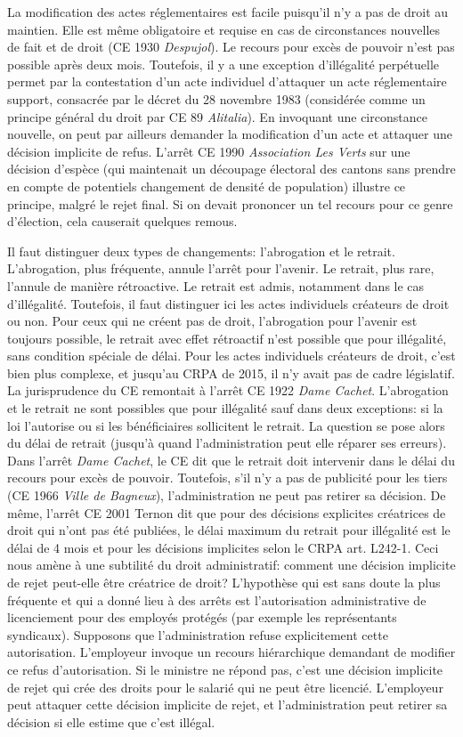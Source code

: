 \documentclass[math]{cours}
\begin{document}
La modification des actes réglementaires est facile puisqu'il n'y a pas de droit au maintien.
Elle est même obligatoire et requise en cas de circonstances nouvelles de fait et de droit (CE 1930 \emph{Despujol}).
Le recours pour excès de pouvoir n'est pas possible après deux mois.
Toutefois, il y a une exception d'illégalité perpétuelle permet par la contestation d'un acte individuel d'attaquer un acte réglementaire support, consacrée par le décret du 28 novembre 1983 (considérée comme un principe général du droit par CE 89 \emph{Alitalia}).
En invoquant une circonstance nouvelle, on peut par ailleurs demander la modification d'un acte et attaquer une décision implicite de refus.
L'arrêt CE 1990 \emph{Association Les Verts} sur une décision d'espèce (qui maintenait un découpage électoral des cantons sans prendre en compte de potentiels changement de densité de population) illustre ce principe, malgré le rejet final.
Si on devait prononcer un tel recours pour ce genre d'élection, cela causerait quelques remous.

Il faut distinguer deux types de changements: l'abrogation et le retrait.
L'abrogation, plus fréquente, annule l'arrêt pour l'avenir. Le retrait, plus rare, l'annule de manière rétroactive.
Le retrait est admis, notamment dans le cas d'illégalité.
Toutefois, il faut distinguer ici les actes individuels créateurs de droit ou non.
Pour ceux qui ne créent pas de droit, l'abrogation pour l'avenir est toujours possible, le retrait avec effet rétroactif n'est possible que pour illégalité, sans condition spéciale de délai.
Pour les actes individuels créateurs de droit, c'est bien plus complexe, et jusqu'au CRPA de 2015, il n'y avait pas de cadre législatif.
La jurisprudence du CE remontait à l'arrêt CE 1922 \emph{Dame Cachet}.
L'abrogation et le retrait ne sont possibles que pour illégalité sauf dans deux exceptions: si la loi l'autorise ou si les bénéficiaires sollicitent le retrait.
La question se pose alors du délai de retrait (jusqu'à quand l'administration peut elle réparer ses erreurs).
Dans l'arrêt \emph{Dame Cachet}, le CE dit que le retrait doit intervenir dans le délai du recours pour excès de pouvoir.
Toutefois, s'il n'y a pas de publicité pour les tiers (CE 1966 \emph{Ville de Bagneux}), l'administration ne peut pas retirer sa décision.
De même, l'arrêt CE 2001 Ternon dit que pour des décisions explicites créatrices de droit qui n'ont pas été publiées, le délai maximum du retrait pour illégalité est le délai de 4 mois et pour les décisions implicites selon le CRPA art. L242-1.
Ceci nous amène à une subtilité du droit administratif: comment une décision implicite de rejet peut-elle être créatrice de droit?
L'hypothèse qui est sans doute la plus fréquente et qui a donné lieu à des arrêts est l'autorisation administrative de licenciement pour des employés protégés (par exemple les représentants syndicaux).
Supposons que l'administration refuse explicitement cette autorisation.
L'employeur invoque un recours hiérarchique demandant de modifier ce refus d'autorisation.
Si le ministre ne répond pas, c'est une décision implicite de rejet qui crée des droits pour le salarié qui ne peut être licencié.
L'employeur peut attaquer cette décision implicite de rejet, et l'administration peut retirer sa décision si elle estime que c'est illégal.
\end{document}
